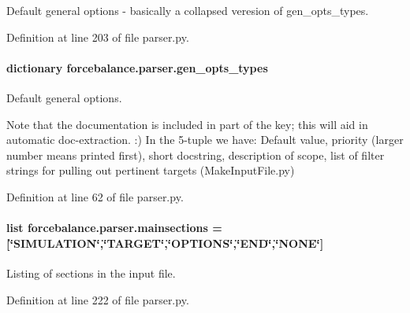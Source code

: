 Default general options -\/ basically a collapsed veresion of gen\-\_\-opts\-\_\-types. 



Definition at line 203 of file parser.\-py.

\hypertarget{namespaceforcebalance_1_1parser_a1ccdff008f4be5f63c068d2a592d69ab}{
\paragraph[{gen\-\_\-opts\-\_\-types}]{\setlength{\rightskip}{0pt plus 5cm}dictionary forcebalance.\-parser.\-gen\-\_\-opts\-\_\-types}}\label{namespaceforcebalance_1_1parser_a1ccdff008f4be5f63c068d2a592d69ab}


Default general options. 

Note that the documentation is included in part of the key; this will aid in automatic doc-\/extraction. \-:) In the 5-\/tuple we have\-: Default value, priority (larger number means printed first), short docstring, description of scope, list of filter strings for pulling out pertinent targets (Make\-Input\-File.\-py) 

Definition at line 62 of file parser.\-py.

\hypertarget{namespaceforcebalance_1_1parser_a682a3870774181592a7a4784ab108ae6}{
\paragraph[{mainsections}]{\setlength{\rightskip}{0pt plus 5cm}list forcebalance.\-parser.\-mainsections = \mbox{[}\char`\"{}S\-I\-M\-U\-L\-A\-T\-I\-O\-N\char`\"{},\char`\"{}T\-A\-R\-G\-E\-T\char`\"{},\char`\"{}O\-P\-T\-I\-O\-N\-S\char`\"{},\char`\"{}E\-N\-D\char`\"{},\char`\"{}N\-O\-N\-E\char`\"{}\mbox{]}}}\label{namespaceforcebalance_1_1parser_a682a3870774181592a7a4784ab108ae6}


Listing of sections in the input file. 



Definition at line 222 of file parser.\-py.

